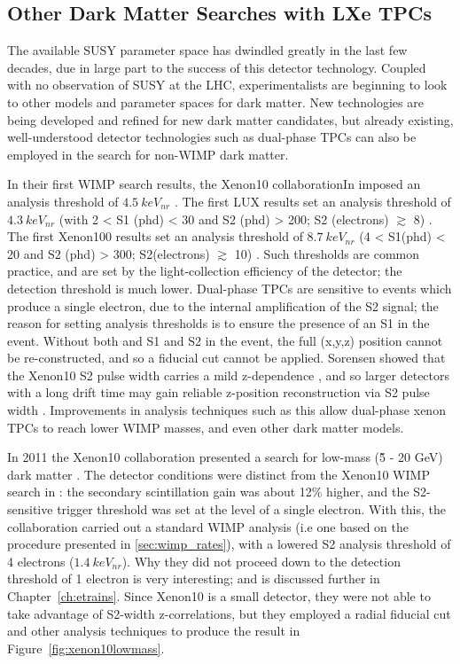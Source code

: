 \subsection{Other Dark Matter Searches with LXe TPCs}
The available \ac{SUSY} parameter space has dwindled greatly in the last few decades, due in large part to the success of this detector technology. Coupled with no observation of \ac{SUSY} at the \ac{LHC}, experimentalists are beginning to look to other models and parameter spaces for dark matter. New technologies are being developed and refined for new dark matter candidates, but already existing, well-understood detector technologies such as dual-phase \ac{TPC}s can also be employed in the search for non-\ac{WIMP} dark matter. 

In their first \ac{WIMP} search results, the Xenon10 collaborationIn imposed an analysis threshold of $4.5~keV_{nr}$ \cite{Xenon10WIMP}. The first \ac{LUX} results set an analysis threshold of $4.3~keV_{nr}$ (with 2 < S1 (phd) < 30 and S2 (phd) > 200; S2 (electrons) $\gtrsim$ 8) \cite{LUXFirstResults}. The first Xenon100 results set an analysis threshold of $8.7~keV_{nr}$ (4 < S1(phd) < 20 and S2 (phd) > 300; S2(electrons) $\gtrsim$ 10) \cite{Xenon100FirstResults}. Such thresholds are common practice, and are set by the light-collection efficiency of the detector; the detection threshold is much lower. Dual-phase \ac{TPC}s are sensitive to events which produce a single electron, due to the internal amplification of the S2 signal; the reason for setting analysis thresholds is to ensure the presence of an S1 in the event. Without both and S1 and S2 in the event, the full (x,y,z) position cannot be re-constructed, and so a fiducial cut cannot be applied. Sorensen showed that the Xenon10 S2 pulse width carries a mild z-dependence \cite{Sorensen2010}, and so larger detectors with a long drift time may gain reliable z-position reconstruction via S2 pulse width \cite{SorensenS2Width}. Improvements in analysis techniques such as this allow dual-phase xenon \ac{TPC}s to reach lower \ac{WIMP} masses, and even other dark matter models. 

In 2011 the Xenon10 collaboration presented a search for low-mass (\~5 - 20 GeV) dark matter \cite{Angle2011}. The detector conditions were distinct from the Xenon10 \ac{WIMP} search in \cite{Xenon10WIMP}: the secondary scintillation gain was about 12\% higher, and the S2-sensitive trigger threshold was set at the level of a single electron. With this, the collaboration carried out a standard \ac{WIMP} analysis (i.e one based on the procedure presented in \ref{sec:wimp_rates}), with a lowered S2 analysis threshold of 4 electrons ($1.4~keV_{nr}$). Why they did not proceed down to the detection threshold of 1 electron is very interesting; and is discussed further in Chapter~\ref{ch:etrains}. Since Xenon10 is a small detector, they were not able to take advantage of S2-width z-correlations, but they employed a radial fiducial cut and other analysis techniques to produce the result in Figure~\ref{fig:xenon10lowmass}.

